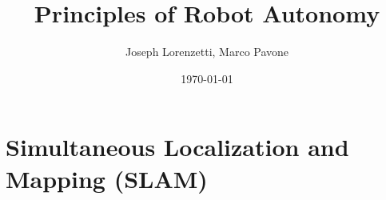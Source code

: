 \documentclass[nohyper,nobib]{tufte-book}
\title{Principles of Robot Autonomy}
\author{Joseph Lorenzetti, Marco Pavone}
\date{\today}
\begin{document}
\chapter{Simultaneous Localization and Mapping (SLAM)}


\printbibliography
\end{document}
